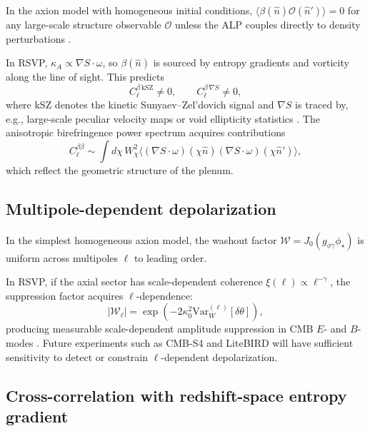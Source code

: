 \documentclass[12pt]{article}
\theoremstyle{definition}
\newcommand{\kA}{\kappa_A}
\newcommand{\VarW}{\mathrm{Var}_W}
\newcommand{\PLSSphi}{\phi_\star}
\newcommand{\gpg}{g_{\phi\gamma}}
\begin{document}
In the axion model with homogeneous initial conditions,
$\langle\beta(\hat{n})\mathcal{O}(\hat{n}')\rangle=0$ for any large-scale
structure observable $\mathcal{O}$ unless the ALP couples directly to
density perturbations \cite{Pospelov2009,Arvanitaki2010}.

In RSVP, $\kA\propto\nabla S\cdot\omega$, so $\beta(\hat{n})$ is sourced
by entropy gradients and vorticity along the line of sight.
This predicts
\begin{equation}
  C_\ell^{\beta\,\mathrm{kSZ}}\neq0,
  \qquad
  C_\ell^{\beta\,\nabla S}\neq0,
  \label{eq:cross_correlations}
\end{equation}
where kSZ denotes the kinetic Sunyaev--Zel'dovich signal
\cite{Sunyaev1980,Ma2002} and $\nabla S$ is traced by, e.g.,
large-scale peculiar velocity maps or void ellipticity statistics
\cite{Lavaux2010,Hamaus2015}.
The anisotropic birefringence power spectrum \cite{Gluscevic2012,Yadav2012}
acquires contributions
\begin{equation}
  C_\ell^{\beta\beta}
  \sim \int d\chi\,W_\chi^2
    \langle(\nabla S\cdot\omega)(\chi\hat{n})
           (\nabla S\cdot\omega)(\chi\hat{n}')\rangle,
\end{equation}
which reflect the geometric structure of the plenum.

\subsection{Multipole-dependent depolarization}

In the simplest homogeneous axion model, the washout factor
$\mathcal{W}=J_0(\gpg\PLSSphi)$ is uniform across multipoles $\ell$
to leading order.

In RSVP, if the axial sector has scale-dependent coherence
$\xi(\ell)\propto\ell^{-\gamma}$, the suppression factor acquires
$\ell$-dependence:
\begin{equation}
  |\mathcal{W}_\ell|
  = \exp\!\left(-2\kappa_0^2\VarW^{(\ell)}[\delta\theta]\right),
  \label{eq:ell_dep}
\end{equation}
producing measurable scale-dependent amplitude suppression in CMB
$E$- and $B$-modes \cite{Gluscevic2012,Sherfield2023,SPTPol2021}.
Future experiments such as CMB-S4 \cite{CMBS4} and LiteBIRD
\cite{LiteBIRD2022} will have sufficient sensitivity to detect or
constrain $\ell$-dependent depolarization.

\subsection{Cross-correlation with redshift-space entropy gradient}
\end{document}
